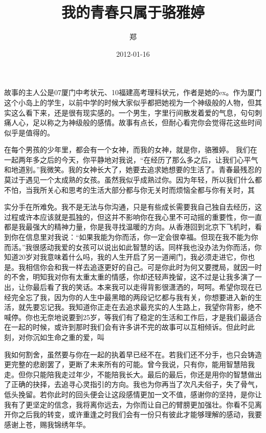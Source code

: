 \documentclass{article}
\title{我的青春只属于骆雅婷}
\author{郑}
\date{2012-01-16}
\begin{document}

\maketitle


\Large

﻿故事的主人公是07厦门中考状元、10福建高考理科状元，作者是她的ex。作为厦门这个小岛上的学生，以前中学的时候大家似乎都把她视为一个神级般的人物，但其实这么看下来，还是很有现实感的。一个男生，字里行间散发着爱的气息，句句刺痛人心，足以称之为神级般的感情。故事有点长，但耐心看完你会觉得花这些时间似乎是值得的。

在每个男孩的少年里，都会有一个女神，而我的女神，就是你，骆雅婷。
我们在一起两年多之后的今天，你平静地对我说，“在经历了那么多之后，让我们心平气和地道别。”我微笑。我的女神长大了，她要去追求她想要的生活了。青春最残忍的莫过于遇见一个太成熟的女孩。虽然我似乎成熟过你。因为年轻，所以我们什么都不怕，当我所关心和思考的生活大部分都与你无关时而烦恼全都与你有关时，其

\newpage 

实分手在所难免。我不是无法与你沟通，只是有些成长需要我自己独自去经历，这过程或许本应该就是孤独的，但这并不影响你在我心里不可动摇的重要性，你一直都是我最强大的精神力量，你是我寻找温暖的方向。从香港回到北京下飞机时，看到你在信息里对我说：“如果我能为你而活，你一定会很幸福。但现在我不能为你而活。”我很感动我爱的女孩可以说出如此智慧的话。同样我也没办法为你而活，你知道20岁对我意味着什么吗，我的人生开启了另一道闸门，我必须走进它，你也是。我相信你会和我一样去追逐更好的自己。可是你此时为何又要搅局，就因一时的不舍，明知我对你有太重太重的情感，你却还轻声挽留，这不过是让我多演了一出，让你最后看了我的笑话。本来我可以走得背影很潇洒的，呵呵。希望你现在已经完全忘了我，因为你的人生中最黑暗的两段记忆都与我有关，你想要进入新的生活，就先要忘记我。我知道你正走在去追求最充实的人生路上，我望你背影，绝不喊停。你也无奈地说要到25岁，等我们有了稳定的生活和工作后，才是我们最适合在一起的时候，或许到那时我们会有许多讲不完的故事可以互相倾诉。但此时此刻，对你沉如生命之重的爱，叫

\newpage 

我如何割舍，虽然要与你在一起的执着早已经不在。若我们还不分手，也只会铸造更完整的悲剧罢了，更断了未来所有的可能。曾今我说，只有你，能用智慧陪我走。但你只能陪我走过年少，不能陪我长大。最后的最后，你还是用你的智慧做出了正确的抉择，去追寻心灵指引的方向。我也为你再当了次凡夫俗子，失了骨气，低头挽留。若你此时的回头便会让这段感情更加一文不值，感谢你的坚持，是你让我有了更坚定的信念，我将离你远去，为你而让自己的臂膀更加强壮。你看不见离开你之后我的转变，或许重逢之时我们会有一份只有彼此才能够理解的感动，我要感谢上苍，赐我锦绣年华。
\end{document}
